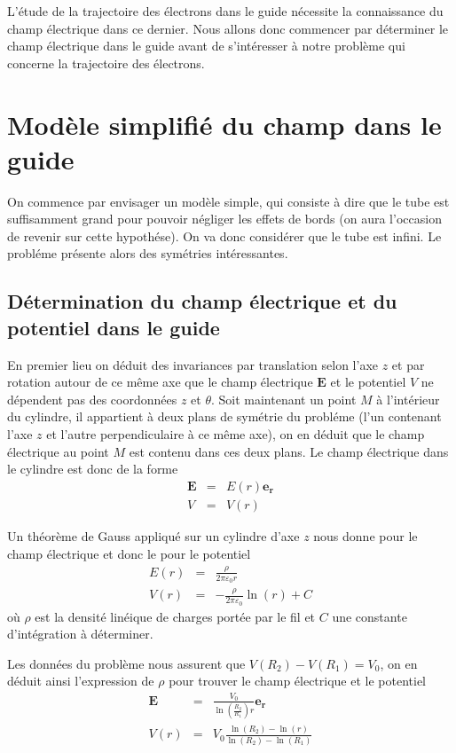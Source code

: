 \documentclass[a4paper,12pt]{article}
\begin{document}
L'étude de la trajectoire des électrons dans le guide nécessite la connaissance du champ électrique dans ce dernier. Nous allons donc commencer par déterminer le champ électrique dans le guide avant de s'intéresser à notre problème qui concerne la trajectoire des électrons.

\section{Modèle simplifié du champ dans le guide}


On commence par envisager un modèle simple, qui consiste à dire que le tube est suffisamment grand pour pouvoir négliger les effets de bords (on aura l'occasion de revenir sur cette hypothése). On va donc considérer que le tube est infini. Le probléme présente alors des symétries intéressantes.


\subsection{Détermination du champ électrique et du potentiel dans le guide}

En premier lieu on déduit des invariances par translation selon l'axe $z$ et par rotation autour de ce même axe que le champ électrique $\mathbf{E}$ et le potentiel $V$ ne dépendent pas des coordonnées $z$ et $\theta$. Soit maintenant un point $M$ à l'intérieur du cylindre, il appartient à deux plans de symétrie du probléme (l'un contenant l'axe $z$ et l'autre perpendiculaire à ce même axe), on en déduit que le champ électrique au point $M$ est contenu dans ces deux plans. Le champ électrique dans le cylindre est donc de la forme
\begin{eqnarray}
\mathbf{E} &=& E(r) \mathbf{e_r}\\
V &=& V(r)
\end{eqnarray}

Un théorème de Gauss appliqué sur un cylindre d'axe $z$ nous donne pour le champ électrique et donc le pour le potentiel
\begin{eqnarray}
E(r) &=& \frac{\rho}{2 \pi \varepsilon_0 r}\\
V(r) &= &-\frac{\rho}{2 \pi \varepsilon_0} \ln(r) + C
\end{eqnarray}
où $\rho$ est la densité linéique de charges portée par le fil et $C$ une constante d'intégration à déterminer.

Les données du problème nous assurent que $V(R_2) - V(R_1) = V_0$, on en déduit ainsi l'expression de $\rho$ pour trouver le champ électrique et le potentiel
\begin{eqnarray}
\mathbf{E} &=& \frac{V_0}{\ln(\frac{R_2}{R_1})r} \mathbf{e_r}\\
V(r) &=& V_0 \frac{\ln(R_2) - \ln(r)}{\ln(R_2) - \ln(R_1)} 
\end{eqnarray}
\end{document}
